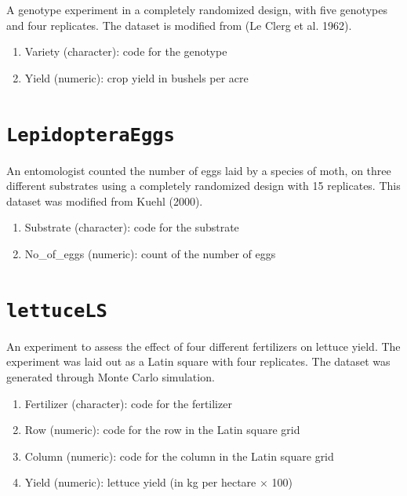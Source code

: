 \documentclass[
  letterpaper,
  DIV=11,
  numbers=noendperiod]{scrreprt}
\providecommand{\tightlist}{%
  \setlength{\itemsep}{0pt}\setlength{\parskip}{0pt}}
\begin{document}

A genotype experiment in a completely randomized design, with five
genotypes and four replicates. The dataset is modified from (Le Clerg et
al. 1962).

\begin{enumerate}
\def\labelenumi{\arabic{enumi}.}
\tightlist
\item
  Variety (character): code for the genotype
\item
  Yield (numeric): crop yield in bushels per acre
\end{enumerate}

\section*{\texorpdfstring{\texttt{LepidopteraEggs}}{LepidopteraEggs}}\label{lepidopteraeggs}


An entomologist counted the number of eggs laid by a species of moth, on
three different substrates using a completely randomized design with 15
replicates. This dataset was modified from Kuehl (2000).

\begin{enumerate}
\def\labelenumi{\arabic{enumi}.}
\tightlist
\item
  Substrate (character): code for the substrate
\item
  No\_of\_eggs (numeric): count of the number of eggs
\end{enumerate}

\section*{\texorpdfstring{\texttt{lettuceLS}}{lettuceLS}}\label{lettucels}


An experiment to assess the effect of four different fertilizers on
lettuce yield. The experiment was laid out as a Latin square with four
replicates. The dataset was generated through Monte Carlo simulation.

\begin{enumerate}
\def\labelenumi{\arabic{enumi}.}
\tightlist
\item
  Fertilizer (character): code for the fertilizer
\item
  Row (numeric): code for the row in the Latin square grid
\item
  Column (numeric): code for the column in the Latin square grid
\item
  Yield (numeric): lettuce yield (in kg per hectare \(\times\) 100)
\end{enumerate}
\end{document}
